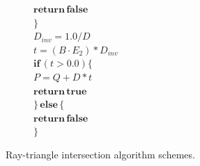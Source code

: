 \begin{figure}[htbp]
\begin{subfigure}[t]{.4\textwidth}
		\quad \quad $\mathbf{return \, false}$\\
		$\}$\\
		$D_{inv} = 1.0 / D$\\
		$t = (B \cdot E_2) * D_{inv}$\\
		$\mathbf{if} \, (t > 0.0) \{$\\
		\quad $P = Q + D * t$\\
		\quad $\mathbf{return \, true}$\\
		$\} \, \mathbf{else} \, \{$\\
		\quad $\mathbf{return \, false}$\\
		$\}$\\
	\end{subfigure}
\hfill
\caption{Ray-triangle intersection algorithm schemes.}
\end{figure}